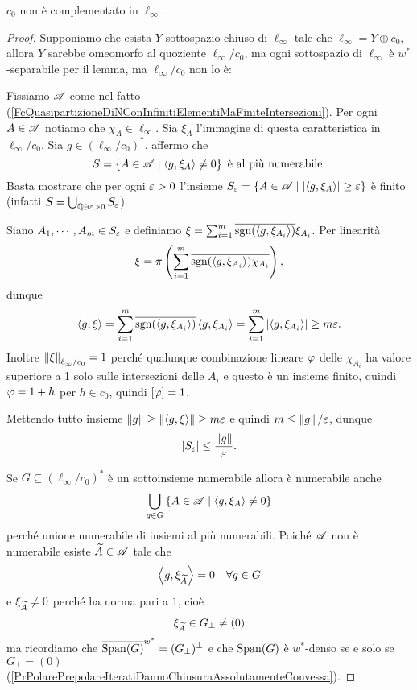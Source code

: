 \begin{proposition}
$c_0$ non \`e complementato in $\ell_\infty$.
\end{proposition}
\begin{proof}
Supponiamo che esista $Y$ sottospazio chiuso di $\ell_\infty$ tale che $\ell_\infty=Y\oplus c_0$, allora $Y$ sarebbe omeomorfo al quoziente $\ell_\infty/c_0$, ma ogni sottospazio di $\ell_\infty$ \`e $w^\ast$-separabile per il lemma, ma $\ell_\infty/c_0$ non lo \`e:

Fissiamo $\mathscr{A}$ come nel fatto (\ref{FcQuasipartizioneDiNConInfinitiElementiMaFiniteIntersezioni}). Per ogni $A\in \mathscr{A}$ notiamo che $\chi_A\in\ell_\infty$. Sia $\xi_A$ l'immagine di questa caratteristica in $\ell_\infty/c_0$. Sia $g\in (\ell_\infty/c_0)^\ast$, affermo che
\[S=\left\{{A\in\mathscr{A}\mid \left\langle {g,\xi_A}\right\rangle\neq 0}\right\}\text{ \`e al pi\`u numerabile.}\]
Basta mostrare che per ogni $\varepsilon>0$ l'insieme $S_\varepsilon=\left\{{A\in\mathscr{A}\mid \left|{\left\langle {g,\xi_A}\right\rangle}\right|\geq \varepsilon}\right\}$ \`e finito (infatti $S=\bigcup_{\mathbb{Q}\ni\varepsilon>0}S_\varepsilon$).

Siano $A_1,\cdots, A_m\in S_\varepsilon$ e definiamo $\xi=\sum_{i=1}^m \overline{\operatorname{sgn}(\left\langle {g,\xi_{A_i}}\right\rangle)}\xi_{A_i}$. Per linearit\`a
\[\xi=\pi\left({\sum_{i=1}^m\overline{\operatorname{sgn}(\left\langle {g,\xi_{A_i}}\right\rangle)\chi_{A_i}}}\right),\]
dunque
\[\left\langle {g,\xi}\right\rangle=\sum_{i=1}^m\overline{\operatorname{sgn}(\left\langle {g,\xi_{A_i}}\right\rangle)}\left\langle {g,\xi_{A_i}}\right\rangle=\sum_{i=1}^m\left|{\left\langle {g,\xi_{A_i}}\right\rangle}\right|\geq m\varepsilon.\]
Inoltre $\left\Vert{\xi}\right\Vert_{\ell_\infty/c_0}=1$ perch\'e qualunque combinazione lineare $\varphi$ delle $\chi_{A_i}$ ha valore superiore a 1 solo sulle intersezioni delle $A_i$ e questo \`e un insieme finito, quindi $\varphi=1+h$ per $h\in c_0$, quindi $[\varphi]=1$.

Mettendo tutto insieme $\left\Vert{g}\right\Vert\geq \left\Vert{\left\langle {g,\xi}\right\rangle}\right\Vert\geq m\varepsilon$ e quindi $m\leq \left\Vert{g}\right\Vert/\varepsilon$, dunque \[\left|{S_\varepsilon}\right|\leq \frac{\left\Vert{g}\right\Vert}{\varepsilon}.\]

Se $G\subseteq (\ell_\infty/c_0)^\ast$ \`e un sottoinsieme numerabile allora \`e numerabile anche
\[\bigcup_{g\in G}\left\{{A\in\mathscr{A}\mid \left\langle {g,\xi_A}\right\rangle\neq 0}\right\}\]
perch\'e unione numerabile di insiemi al pi\`u numerabili. Poich\'e $\mathscr{A}$ non \`e numerabile esiste $\widetilde{A}\in \mathscr{A}$ tale che
\[\left\langle {g,\xi_{\widetilde{A}}}\right\rangle=0\quad \forall g\in G\]
e $\xi_{\widetilde{A}}\neq 0$ perch\'e ha norma pari a $1$, cio\`e 
\[\xi_{\widetilde{A}}\in G_\perp\neq (0)\]
ma ricordiamo che $\overline{\operatorname{Span}(G)}^{w^\ast}=(G_\perp)^\perp$ e che $\operatorname{Span}(G)$ \`e $w^\ast$-denso se e solo se $G_\perp=(0)$ (\ref{PrPolarePrepolareIteratiDannoChiusuraAssolutamenteConvessa}).
\end{proof}